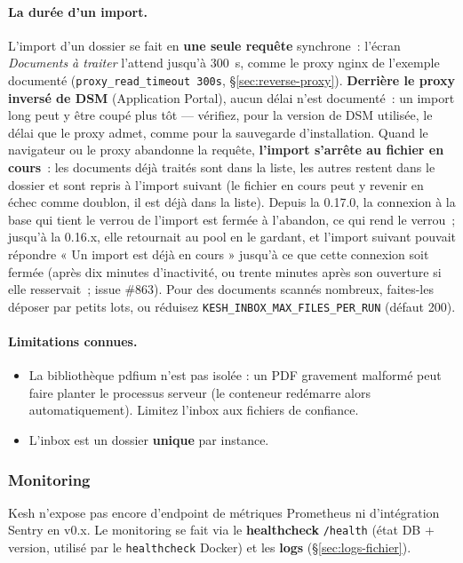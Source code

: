 \documentclass[a4paper,11pt,oneside]{article}
\begin{document}
\paragraph{La durée d'un import.} L'import d'un dossier se fait en \textbf{une seule
requête} synchrone~: l'écran \emph{Documents à traiter} l'attend jusqu'à 300~s, comme le
proxy nginx de l'exemple documenté (\texttt{proxy\_read\_timeout 300s},
\S\ref{sec:reverse-proxy}). \textbf{Derrière le proxy inversé de DSM} (Application Portal),
aucun délai n'est documenté~: un import long peut y être coupé plus tôt --- vérifiez, pour
la version de DSM utilisée, le délai que le proxy admet, comme pour la sauvegarde
d'installation. Quand le navigateur ou le proxy abandonne la requête, \textbf{l'import
s'arrête au fichier en cours}~: les documents déjà traités sont dans la liste, les autres
restent dans le dossier et sont repris à l'import suivant (le fichier en cours peut y
revenir en échec comme doublon, il est déjà dans la liste). Depuis la 0.17.0, la
connexion à la base qui tient le verrou de l'import est fermée à l'abandon, ce qui rend
le verrou~; jusqu'à la 0.16.x, elle retournait au pool en le gardant, et l'import suivant
pouvait répondre « Un import est déjà en cours » jusqu'à ce que cette connexion soit
fermée (après dix minutes d'inactivité, ou trente minutes après son ouverture si elle
resservait~; issue \#863). Pour des
documents scannés nombreux, faites-les déposer par petits lots, ou réduisez
\texttt{KESH\_INBOX\_MAX\_FILES\_PER\_RUN} (défaut 200).

\paragraph{Limitations connues.}
\begin{itemize}
    \item La bibliothèque pdfium n'est pas isolée : un PDF gravement malformé
    peut faire planter le processus serveur (le conteneur redémarre alors
    automatiquement). Limitez l'inbox aux fichiers de confiance.
    \item L'inbox est un dossier \textbf{unique} par instance.
\end{itemize}

\subsubsection{Monitoring}

Kesh n'expose pas encore d'endpoint de métriques Prometheus ni d'intégration
Sentry en v0.x. Le monitoring se fait via le \textbf{healthcheck} \texttt{/health}
(état DB + version, utilisé par le \texttt{healthcheck} Docker) et les
\textbf{logs} (\S\ref{sec:logs-fichier}).
\end{document}
